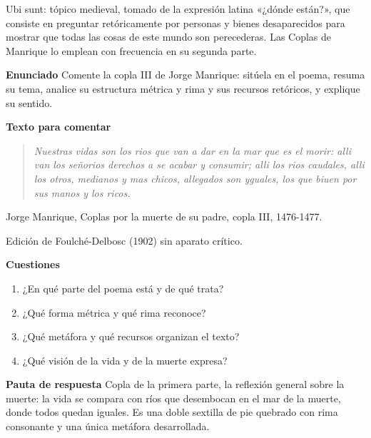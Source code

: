 \documentclass{book}
\begin{document}
\begin{tcolorbox}[title={Definición}, studiumdef, breakable]

Ubi sunt: tópico medieval, tomado de la expresión latina «¿dónde están?», que consiste en preguntar retóricamente por personas y bienes desaparecidos para mostrar que todas las cosas de este mundo son perecederas. Las Coplas de Manrique lo emplean con frecuencia en su segunda parte.

\end{tcolorbox}

\begin{tcolorbox}[title={Ejercicio resuelto}, studiumworked, breakable]

\noindent\textbf{Enunciado}
Comente la copla III de Jorge Manrique: sitúela en el poema, resuma su tema, analice su estructura métrica y rima y sus recursos retóricos, y explique su sentido.


\noindent\textbf{Texto para comentar}

\begin{quote}
\itshape Nuestras vidas son los rios que van a dar en la mar que es el morir: alli van los señorios derechos a se acabar y consumir; alli los rios caudales, alli los otros, medianos y mas chicos, allegados son yguales, los que biuen por sus manos y los ricos.
\end{quote}
{\noindent\footnotesize Jorge Manrique, Coplas por la muerte de su padre, copla III, 1476-1477.\par}
{\noindent\footnotesize Edición de Foulché-Delbosc (1902) sin aparato crítico.\par}

\noindent\textbf{Cuestiones}
\begin{enumerate}
\item ¿En qué parte del poema está y de qué trata?
\item ¿Qué forma métrica y qué rima reconoce?
\item ¿Qué metáfora y qué recursos organizan el texto?
\item ¿Qué visión de la vida y de la muerte expresa?
\end{enumerate}

\noindent\textbf{Pauta de respuesta}
Copla de la primera parte, la reflexión general sobre la muerte: la vida se compara con ríos que desembocan en el mar de la muerte, donde todos quedan iguales. Es una doble sextilla de pie quebrado con rima consonante y una única metáfora desarrollada.



\end{tcolorbox}
\end{document}
